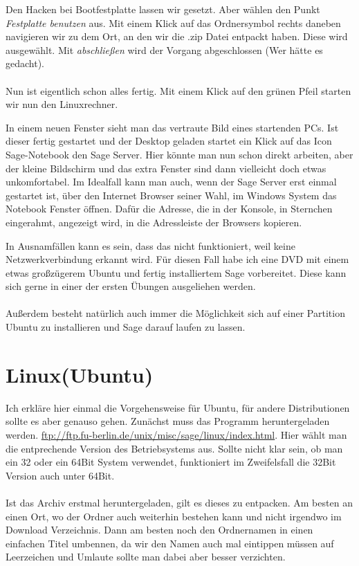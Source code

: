 \documentclass[a4paper,10pt]{article}
\begin{document}
Den Hacken bei Bootfestplatte lassen wir gesetzt. Aber wählen den Punkt \emph{Festplatte benutzen} aus. Mit einem Klick auf das 
Ordnersymbol rechts daneben navigieren wir zu dem Ort, an den wir die .zip Datei entpackt haben. Diese wird ausgewählt. Mit 
\emph{abschließen} wird der Vorgang abgeschlossen (Wer hätte es gedacht).
\paragraph{}
Nun ist eigentlich schon alles fertig. Mit einem Klick auf den grünen Pfeil starten wir nun den Linuxrechner.

In einem neuen Fenster sieht man das vertraute Bild eines startenden PCs. Ist dieser fertig gestartet und der Desktop geladen 
 startet ein Klick auf das Icon Sage-Notebook den Sage Server.
Hier könnte man nun schon direkt arbeiten, aber der kleine Bildschirm und das extra Fenster sind dann vielleicht doch etwas unkomfortabel.
Im Idealfall kann man auch, wenn der Sage Server erst einmal gestartet ist, über den Internet Browser seiner Wahl, im Windows System
das Notebook Fenster öffnen. Dafür die Adresse, die in der Konsole, in Sternchen eingerahmt, angezeigt wird, in die Adressleiste der Browsers 
kopieren.

In Ausnamfällen kann es sein, dass das nicht funktioniert, weil keine Netzwerkverbindung erkannt wird. Für diesen Fall habe ich eine
DVD mit einem etwas großzügerem Ubuntu und fertig installiertem Sage vorbereitet. Diese kann sich gerne in einer der ersten Übungen
ausgeliehen werden.
\paragraph{}
Außerdem besteht natürlich auch immer die Möglichkeit sich auf einer Partition Ubuntu zu installieren und Sage darauf laufen zu lassen.




\section{Linux(Ubuntu)}
Ich erkläre hier einmal die Vorgehensweise für Ubuntu, für andere Distributionen sollte es aber genauso gehen.
Zunächst muss das Programm heruntergeladen werden. \url{ftp://ftp.fu-berlin.de/unix/misc/sage/linux/index.html}. Hier wählt man die 
entprechende Version des Betriebsystems aus. Sollte nicht klar sein, ob man ein 32 oder ein 64Bit System verwendet, funktioniert
im Zweifelsfall die 32Bit Version auch unter 64Bit. 
\paragraph{}
Ist das Archiv erstmal heruntergeladen, gilt es dieses zu entpacken. Am besten an einen Ort, wo der Ordner auch weiterhin bestehen kann
und nicht irgendwo im Download Verzeichnis. Dann am besten noch den Ordnernamen in einen einfachen Titel umbennen, da wir den Namen 
auch mal eintippen müssen auf Leerzeichen und Umlaute sollte man dabei aber besser verzichten.
\end{document}
